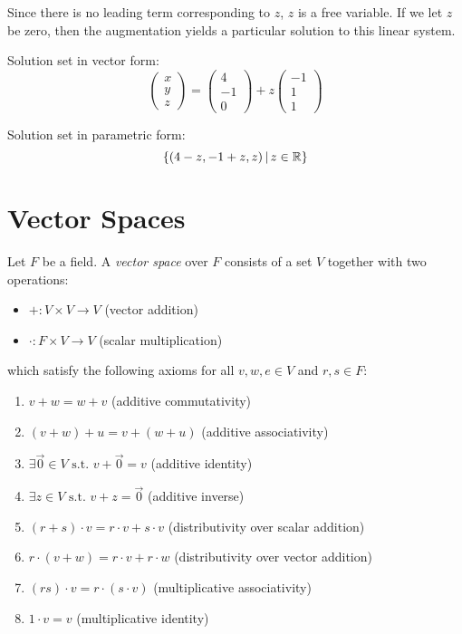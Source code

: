 \begin{exmp}
    Since there is no leading term corresponding to $z$, $z$ is a free variable. If we let $z$ be zero, then the augmentation yields a particular solution to this linear system.

    Solution set in vector form:
    \[\begin{pmatrix}
            x \\ y \\ z
        \end{pmatrix} = \begin{pmatrix}
            4 \\ -1 \\ 0
        \end{pmatrix} + z\begin{pmatrix}
            -1 \\ 1 \\ 1
        \end{pmatrix}\]

    Solution set in parametric form:
    \[\left\{\left(4 - z, -1 + z, z\right) \,\middle|\, z \in \mathbb{R} \right\}\]

\end{exmp}

\section{Vector Spaces}

\begin{defn}
    Let $F$ be a field. A \emph{vector space} over $F$ consists of a set $V$ together with two operations:

    \begin{itemize}
        \item[] $+: V \times V \to V$ (vector addition)
        \item[] $\cdot: F \times V \to V$ (scalar multiplication)
    \end{itemize}
    which satisfy the following axioms for all $v, w, e \in V$ and $r, s \in F$:
    \begin{enumerate}
        \item $v + w = w + v$ (additive commutativity)
        \item $(v + w) + u = v + (w + u)$ (additive associativity)
        \item $\exists \vec{0} \in V \textrm{ s.t. } v + \vec{0} = v$ (additive identity)
        \item $\exists z \in V \textrm{ s.t. } v + z = \vec{0}$ (additive inverse)
        \item $(r + s) \cdot v = r \cdot v + s \cdot v$ (distributivity over scalar addition)
        \item $r \cdot (v + w) = r \cdot v + r \cdot w$ (distributivity over vector addition)
        \item $(rs)\cdot v = r \cdot (s \cdot v)$ (multiplicative associativity)
        \item $1 \cdot v = v$ (multiplicative identity)
    \end{enumerate}
\end{defn}

